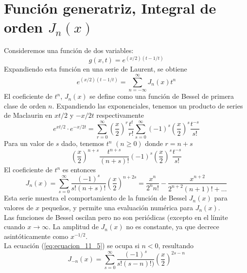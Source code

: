 \section{Función generatriz, Integral de orden $J_{n}(x)$}
Consideremos una función de dos variables:
\begin{equation}
g(x,t) = e^{(x/2)(t-1/t)}
\label{eq:ecuacion_11_1}
\end{equation}
Expandiendo esta función en una serie de Laurent, se obtiene
\begin{equation}
e^{(x/2)(t-1/t)} = \sum_{n=-\infty}^{\infty} J_{n} (x) t^{n}
\label{eq:ecuacion_11_2}
\end{equation}
El coeficiente de $t^{n}$, $J_{n}(x)$ se define como una función de Bessel de primera clase de orden $n$. Expandiendo las exponenciales, tenemos un producto de series de Maclaurin en $xt/2$ y $-x/2t$ respectivamente
\begin{equation}
e^{xt/2} \cdot e^{-x/2t} = \sum_{r=0}^{\infty} \left( \dfrac{x}{2} \right)^{r} \dfrac{t^{t}}{r!} \sum_{s=0}^{\infty} (-1)^{s} \left( \dfrac{x}{2} \right)^{s} \dfrac{t^{-s}}{s!}
\label{eq:ecuacion_11_3}
\end{equation}
Para un valor de $s$ dado, tenemos $t^{n}$ $(n \geq 0 )$ donde $r=n+s$
\begin{equation}
\left( \dfrac{x}{2} \right)^{n+s} \dfrac{t^{n+s}}{(n+s)!} (-1)^{s} \left( \dfrac{x}{2} \right)^{s} \dfrac{t^{-s}}{s!}
\label{eq:ecuacion_11_4}
\end{equation}
El coeficiente de $t^{n}$ es entonces
\begin{equation}
J_{n}(x) = \sum_{s=0}^{\infty} \dfrac{(-1)^{s}}{s! (n+s)!} \left( \dfrac{x}{2} \right)^{n+2s} = \dfrac{x^{n}}{2^{n}n!} - \dfrac{x^{n+2}}{2^{n+2}(n+1)! + \ldots}
\label{eq:ecuacion_11_5}
\end{equation}
Esta serie muestra el comportamiento de la función de Bessel $J_{n}(x)$ para valores de $x$ pequeños, y permite una evaluación numérica para $J_{n}(x)$.
\\
Las funciones de Bessel oscilan pero no son periódicas (excepto en el límite cuando $x \to \infty$. La amplitud de $J_{n}(x)$ no es constante, ya que decrece asintóticamente como $x^{-1/2}$.
\\
La ecuación (\ref{eq:ecuacion_11_5}) se ocupa si $n<0$, resultando
\begin{equation}
J_{-n} (x) = \sum_{s=0}^{\infty} \dfrac{(-1)^{s}}{s!(s-n)!)} \left( \dfrac{x}{2} \right)^{2s-n}
\label{eq:ecuacion_11_6}
\end{equation}
